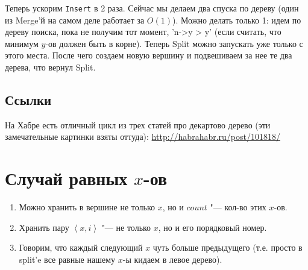 Теперь ускорим \texttt{Insert} в 2 раза.
Сейчас мы делаем два спуска по дереву (один из Merge'й на самом деле работает за $O(1)$).
Можно делать только 1: идем по дереву поиска, пока не получим тот момент, \cpp'n->y > y'
(если считать, что минимум $y$-ов должен быть в корне).
Теперь Split можно запускать уже только с этого места.
После чего создаем новую вершину и подвешиваем за нее те два дерева, что вернул Split.

\subsection{Ссылки}

На Хабре есть отличный цикл из трех статей про декартово дерево (эти замечательные картинки взяты оттуда):
\href{http://habrahabr.ru/post/101818/}{http://habrahabr.ru/post/101818/}

\section[Случай равных x-ов]{Случай равных $x$-ов}

\begin{enumerate}
	\item Можно хранить в вершине не только $x$, но и $count$ "--- кол-во этих $x$-ов.
	\item Хранить пару $\left<x, i\right>$ "--- не только $x$, но и его порядковый номер.
	\item Говорим, что каждый следующий $x$ чуть больше предыдущего (т.е. просто в split'e все равные нашему $x$-ы кидаем в левое дерево).
\end{enumerate}
